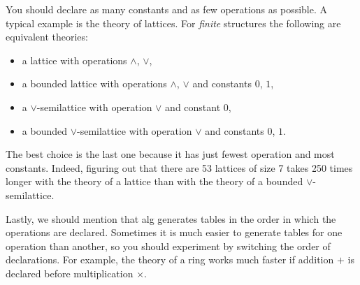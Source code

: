 \documentclass{article}
\begin{document}
You should declare as many constants and as few operations as
possible. A typical example is the theory of lattices. For
\emph{finite} structures the following are equivalent theories:
%
\begin{itemize}
\item a lattice with operations $\land$, $\lor$,
\item a bounded lattice with operations $\land$, $\lor$
  and constants $0$, $1$,
\item a $\lor$-semilattice with operation $\lor$ and constant $0$,
\item a bounded $\lor$-semilattice with operation $\lor$
  and constants $0$, $1$.
\end{itemize}
%
The best choice is the last one because it has just fewest operation and
most constants. Indeed, figuring out that there are 53 lattices of size
7 takes 250 times longer with the theory of a lattice than with the
theory of a bounded $\lor$-semilattice.

Lastly, we should mention that alg generates tables in the order in
which the operations are declared. Sometimes it is much easier to
generate tables for one operation than another, so you should experiment
by switching the order of declarations. For example, the theory of a
ring works much faster if addition $+$ is declared before
multiplication $\times$.
\end{document}
